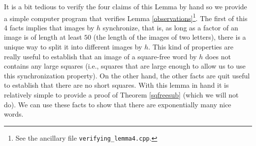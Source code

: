\documentclass[a4paper,12pt]{article}
\begin{document}
 It is a bit tedious to verify the four claims of this Lemma by hand so we provide a simple computer program that verifies Lemma \ref{observations}\footnote{See the ancillary file  \texttt{verifying\_lemma4.cpp}.}.
The first of this 4 facts implies that images by $h$ synchronize, that is, as long as a factor of an image is of length at least $50$ (the length of the images of two letters), there is a unique way to split it into different images by $h$. This kind of properties are really useful to establish that an image of a square-free word by $h$ does not contains any large squares (i.e., squares that are large enough to allow us to use this synchronization property). On the other hand, the other facts are quit useful to establish that there are no short squares. With this lemma in hand it is relatively simple to provide a proof of Theorem \ref{sqfreesub} (which we will not do). 
We can use these facts to show that there are exponentially many nice words.
\end{document}
